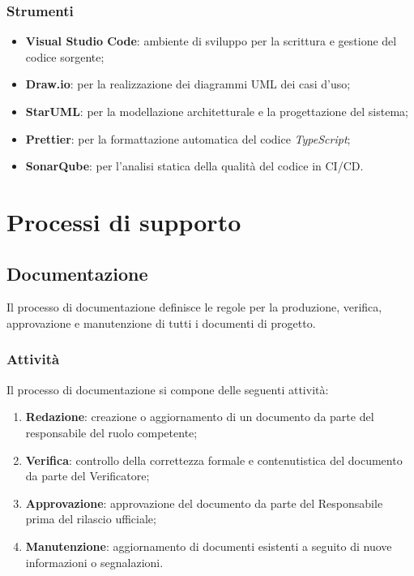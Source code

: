 \documentclass[10pt, letterpaper]{article}
\begin{document}
\subsubsection{Strumenti}
\begin{itemize}
    \item \textbf{Visual Studio Code}: ambiente di sviluppo per la scrittura e gestione del codice sorgente;
    \item \textbf{Draw.io}: per la realizzazione dei diagrammi UML dei casi d'uso;
    \item \textbf{StarUML}: per la modellazione architetturale e la progettazione del sistema;
    \item \textbf{Prettier}: per la formattazione automatica del codice \textit{TypeScript};
    \item \textbf{SonarQube}: per l'analisi statica della qualità del codice in CI/CD.
\end{itemize}


\section{Processi di supporto}

\subsection{Documentazione}
Il processo di documentazione definisce le regole per la produzione, verifica, approvazione e manutenzione di tutti i documenti di progetto.

\subsubsection{Attività}
Il processo di documentazione si compone delle seguenti attività:
\begin{enumerate}
    \item \textbf{Redazione}: creazione o aggiornamento di un documento da parte del responsabile del ruolo competente;
    \item \textbf{Verifica}: controllo della correttezza formale e contenutistica del documento da parte del Verificatore;
    \item \textbf{Approvazione}: approvazione del documento da parte del Responsabile prima del rilascio ufficiale;
    \item \textbf{Manutenzione}: aggiornamento di documenti esistenti a seguito di nuove informazioni o segnalazioni.
\end{enumerate}
\end{document}

